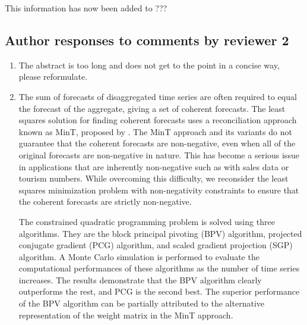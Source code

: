 \documentclass[10pt,a4paper]{article}
\begin{document}
\begin{enumerate}
{	This information has now been added to ???}

\end{enumerate}
\clearpage

\subsection*{Author responses to comments by reviewer 2}

\begin{enumerate}
\item The abstract is too long and does not get to the point in a concise way, please reformulate.
\item []{\color{blue}
	The sum of forecasts of disaggregated time series are often required to equal the forecast of the aggregate, giving a set of coherent forecasts. The least squares solution for finding coherent forecasts uses a reconciliation approach known as MinT, proposed by \citet{Wick2018}. The MinT approach and its variants do not guarantee that the coherent forecasts are non-negative, even when all of the original forecasts are non-negative in nature. This has become a serious issue in applications that are inherently non-negative such as with sales data or tourism numbers. While overcoming this difficulty, we reconsider the least squares minimization problem with non-negativity constraints to ensure that the coherent forecasts are strictly non-negative.

	The constrained quadratic programming problem is solved using three algorithms. They are the block principal pivoting (BPV) algorithm, projected conjugate gradient (PCG) algorithm, and scaled gradient projection (SGP) algorithm. A Monte Carlo simulation is performed to evaluate the computational performances of these algorithms as the number of time series increases. The results demonstrate that the BPV algorithm clearly outperforms the rest, and PCG is the second best. The superior performance of the BPV algorithm can be partially attributed to the alternative representation of the weight matrix in the MinT approach.

}
\end{enumerate}
\end{document}
